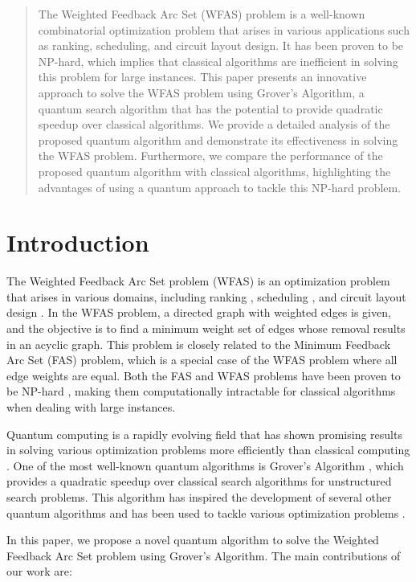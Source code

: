 \begin{abstract}
The Weighted Feedback Arc Set (WFAS) problem is a well-known combinatorial optimization problem that arises in various applications such as ranking, scheduling, and circuit layout design. It has been proven to be NP-hard, which implies that classical algorithms are inefficient in solving this problem for large instances. This paper presents an innovative approach to solve the WFAS problem using Grover's Algorithm, a quantum search algorithm that has the potential to provide quadratic speedup over classical algorithms. We provide a detailed analysis of the proposed quantum algorithm and demonstrate its effectiveness in solving the WFAS problem. Furthermore, we compare the performance of the proposed quantum algorithm with classical algorithms, highlighting the advantages of using a quantum approach to tackle this NP-hard problem.
\end{abstract}

\section{Introduction}

The Weighted Feedback Arc Set problem (WFAS) is an optimization problem that arises in various domains, including ranking \cite{ranking}, scheduling \cite{scheduling}, and circuit layout design \cite{circuit}. In the WFAS problem, a directed graph with weighted edges is given, and the objective is to find a minimum weight set of edges whose removal results in an acyclic graph. This problem is closely related to the Minimum Feedback Arc Set (FAS) problem, which is a special case of the WFAS problem where all edge weights are equal. Both the FAS and WFAS problems have been proven to be NP-hard \cite{nphard}, making them computationally intractable for classical algorithms when dealing with large instances.

Quantum computing is a rapidly evolving field that has shown promising results in solving various optimization problems more efficiently than classical computing \cite{quantum}. One of the most well-known quantum algorithms is Grover's Algorithm \cite{grover}, which provides a quadratic speedup over classical search algorithms for unstructured search problems. This algorithm has inspired the development of several other quantum algorithms and has been used to tackle various optimization problems \cite{grover_application}. 

In this paper, we propose a novel quantum algorithm to solve the Weighted Feedback Arc Set problem using Grover's Algorithm. The main contributions of our work are:

